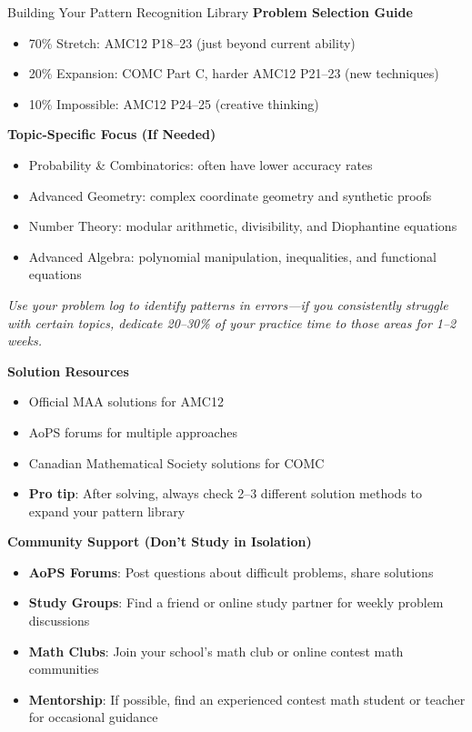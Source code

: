 \documentclass{article}
\begin{document}
\begin{trainingbox}{Building Your Pattern Recognition Library}
\textbf{Problem Selection Guide}
\begin{itemize}[nosep]
    \item 70\% Stretch: AMC12 P18--23 (just beyond current ability)
    \item 20\% Expansion: COMC Part C, harder AMC12 P21--23 (new techniques)
    \item 10\% Impossible: AMC12 P24--25 (creative thinking)
\end{itemize}

\textbf{Topic-Specific Focus (If Needed)}
\begin{itemize}[nosep]
    \item Probability \& Combinatorics: often have lower accuracy rates
    \item Advanced Geometry: complex coordinate geometry and synthetic proofs
    \item Number Theory: modular arithmetic, divisibility, and Diophantine equations
    \item Advanced Algebra: polynomial manipulation, inequalities, and functional equations
\end{itemize}

\emph{Use your problem log to identify patterns in errors---if you consistently struggle with certain topics, dedicate 20--30\% of your practice time to those areas for 1--2 weeks.}

\textbf{Solution Resources}
\begin{itemize}[nosep]
    \item Official MAA solutions for AMC12
    \item AoPS forums for multiple approaches
    \item Canadian Mathematical Society solutions for COMC
    \item \textbf{Pro tip}: After solving, always check 2--3 different solution methods to expand your pattern library
\end{itemize}

\textbf{Community Support (Don't Study in Isolation)}
\begin{itemize}[nosep]
    \item \textbf{AoPS Forums}: Post questions about difficult problems, share solutions
    \item \textbf{Study Groups}: Find a friend or online study partner for weekly problem discussions
    \item \textbf{Math Clubs}: Join your school's math club or online contest math communities
    \item \textbf{Mentorship}: If possible, find an experienced contest math student or teacher for occasional guidance
\end{itemize}


\end{trainingbox}
\end{document}
